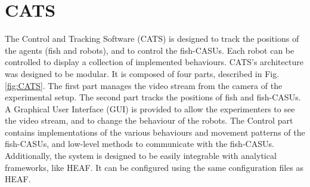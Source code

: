 \documentclass{styles/assisi}
\begin{document}
\section{CATS}
The Control and Tracking Software (CATS) is designed to track the positions of the agents (fish and robots), and to control the fish-CASUs. Each robot can be controlled to display a collection of implemented behaviours. CATS's architecture was designed to be modular. It is composed of four parts, described in Fig. \ref{fig:CATS}. The first part manages the video stream from the camera of the experimental setup. The second part tracks the positions of fish and fish-CASUs. A Graphical User Interface (GUI) is provided to allow the experimenters to see the video stream, and to change the behaviour of the robots. The Control part contains implementations of the various behaviours and movement patterns of the fish-CASUs, and low-level methods to communicate with the fish-CASUs. Additionally, the system is designed to be easily integrable with analytical frameworks, like HEAF. It can be configured using the same configuration files as HEAF.

\end{document}
